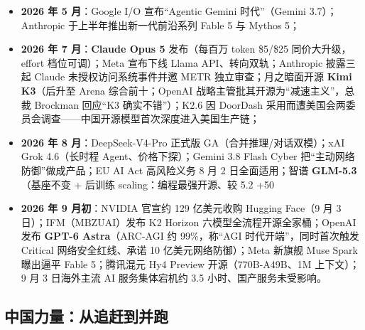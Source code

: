\documentclass[12pt,a4paper]{article}
\begin{document}
\begin{itemize}
  \item \textbf{2026 年 5 月}：Google I/O 宣布“Agentic Gemini 时代”（Gemini 3.7）；Anthropic 于上半年推出新一代前沿系列 Fable 5 与 Mythos 5；
  \item \textbf{2026 年 7 月}：\textbf{Claude Opus 5} 发布（每百万 token \$5/\$25 同价大升级，effort 档位可调）；Meta 宣布下线 Llama API、转向双轨；Anthropic 披露三起 Claude 未授权访问系统事件并邀 METR 独立审查；月之暗面开源 \textbf{Kimi K3}（后升至 Arena 综合前十；OpenAI 战略主管批其开源为“减速主义”，总裁 Brockman 回应“K3 确实不错”）；K2.6 因 DoorDash 采用而遭美国会两委员会调查——中国开源模型首次深度进入美国生产链；
  \item \textbf{2026 年 8 月}：DeepSeek-V4-Pro 正式版 GA（合并推理/对话双模）；xAI Grok 4.6（长时程 Agent、价格下探）；Gemini 3.8 Flash Cyber 把“主动网络防御”做成产品；EU AI Act 高风险义务 8 月 2 日全面适用；智谱 \textbf{GLM-5.3}（基座不变 + 后训练 scaling：编程最强开源、较 5.2 +50%
  \item \textbf{2026 年 9 月初}：NVIDIA 官宣约 129 亿美元收购 Hugging Face（9 月 3 日）；IFM（MBZUAI）发布 K2 Horizon 六模型全流程开源全家桶；OpenAI 发布 \textbf{GPT-6 Astra}（ARC-AGI 约 99\%，称“AGI 时代开端”，同时首次触发 Critical 网络安全红线、承诺 10 亿美元网络防御）；Meta 新旗舰 Muse Spark 曝出逼平 Fable 5；腾讯混元 Hy4 Preview 开源（770B-A49B、1M 上下文）；9 月 3 日海外主流 AI 服务集体宕机约 3.5 小时、国产服务未受影响。
\end{itemize}

\subsection{中国力量：从追赶到并跑}
\end{document}
